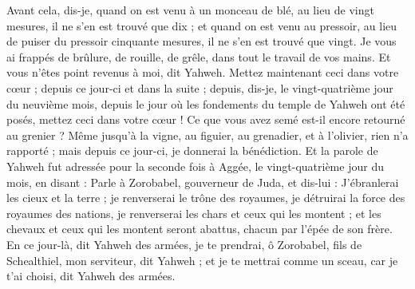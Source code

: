 \begin{multicols}{2}
Avant cela, dis-je, quand on est venu à un monceau de blé, au lieu de vingt mesures, il ne s'en est trouvé que dix ; et quand on est venu au pressoir, au lieu de puiser du pressoir cinquante mesures, il ne s'en est trouvé que vingt.
Je vous ai frappés de brûlure, de rouille, de grêle, dans tout le travail de vos mains. Et vous n'êtes point revenus à moi, dit Yahweh.
Mettez maintenant ceci dans votre cœur ; depuis ce jour-ci et dans la suite ; depuis, dis-je, le vingt-quatrième jour du neuvième mois, depuis le jour où les fondements du temple de Yahweh ont été posés, mettez ceci dans votre cœur !
Ce que vous avez semé est-il encore retourné au grenier ? Même jusqu'à la vigne, au figuier, au grenadier, et à l'olivier, rien n'a rapporté ; mais depuis ce jour-ci, je donnerai la bénédiction.
Et la parole de Yahweh fut adressée pour la seconde fois à Aggée, le vingt-quatrième jour du mois, en disant :
Parle à Zorobabel, gouverneur de Juda, et dis-lui : J'ébranlerai les cieux et la terre ;
je renverserai le trône des royaumes, je détruirai la force des royaumes des nations, je renverserai les chars et ceux qui les montent ; et les chevaux et ceux qui les montent seront abattus, chacun par l'épée de son frère.
En ce jour-là, dit Yahweh des armées, je te prendrai, ô Zorobabel, fils de Schealthiel, mon serviteur, dit Yahweh ; et je te mettrai comme un sceau, car je t'ai choisi, dit Yahweh des armées.
\PPE{}
\end{multicols}
